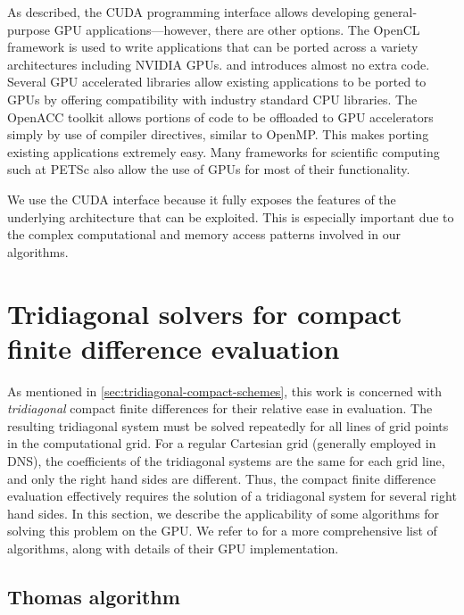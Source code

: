 As described,
the CUDA programming interface
allows developing general-purpose GPU applications---however,
there are other options.
The OpenCL framework \cite{opencl}
is used to write applications
that can be ported across
a variety architectures including NVIDIA GPUs.
and introduces almost no extra code.
Several GPU accelerated libraries \cite{gpulibraries}
allow existing applications to be ported to GPUs
by offering compatibility with industry standard CPU libraries.
The OpenACC \cite{openacc} toolkit allows
portions of code to be offloaded to GPU accelerators
simply by use of compiler directives,
similar to OpenMP.
This makes porting existing applications
extremely easy.
Many frameworks for scientific computing
such at PETSc \cite{petsc-web-page}
also allow the use of GPUs
for most of their functionality.

We use the CUDA interface because
it fully exposes the
features of the underlying architecture
that can be exploited.
This is especially important due to the
complex computational and memory access patterns involved
in our algorithms.

\section{Tridiagonal solvers for compact finite difference evaluation}

As mentioned in \ref{sec:tridiagonal-compact-schemes},
this work is concerned with
\emph{tridiagonal} compact finite differences
for their relative ease in evaluation.
The resulting tridiagonal system must be solved
repeatedly for all lines of grid points in the computational grid.
For a regular Cartesian grid (generally employed in DNS),
the coefficients of the tridiagonal systems
are the same for each grid line,
and only the right hand sides are different.
Thus, the compact finite difference evaluation
effectively requires the solution of a tridiagonal system
for several right hand sides.
In this section,
we describe the applicability of some algorithms
for solving this problem on the GPU.
We refer to \cite{chang2014guide} for
a more comprehensive list of algorithms,
along with details of their GPU implementation.

\subsection{Thomas algorithm}

